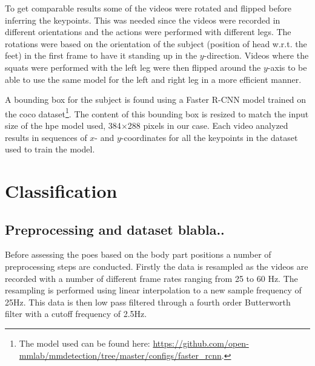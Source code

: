 To get comparable results some of the videos were rotated and flipped before inferring the keypoints. This was needed since the videos were recorded in different orientations and the actions were performed with different legs. The rotations were based on the orientation of the subject (position of head w.r.t. the feet) in the first frame to have it standing up in the $y$-direction. Videos where the squats were performed with the left leg were then flipped around the $y$-axis to be able to use the same model for the left and right leg in a more efficient manner.

A bounding box for the subject is found using a Faster R-CNN model trained on the \gls{coco} dataset\footnote{The model used can be found here: \url{https://github.com/open-mmlab/mmdetection/tree/master/configs/faster_rcnn}.}. The content of this bounding box is resized to match the input size of the \gls{hpe} model used, 384$\times$288 pixels in our case. Each video analyzed results in sequences of $x$- and $y$-coordinates for all the keypoints in the dataset used to train the model.

\section{Classification} \label{sec:met-class}

\subsection{Preprocessing and dataset blabla..} \label{esc:met-class-preproc}
Before assessing the \glspl{poe} based on the body part positions a number of preprocessing steps are conducted. Firstly the data is resampled as the videos are recorded with a number of different frame rates ranging from 25 to 60 Hz. The resampling is performed using linear interpolation to a new sample frequency of 25Hz. This data is then low pass filtered through a fourth order Butterworth filter with a cutoff frequency of 2.5Hz. %

